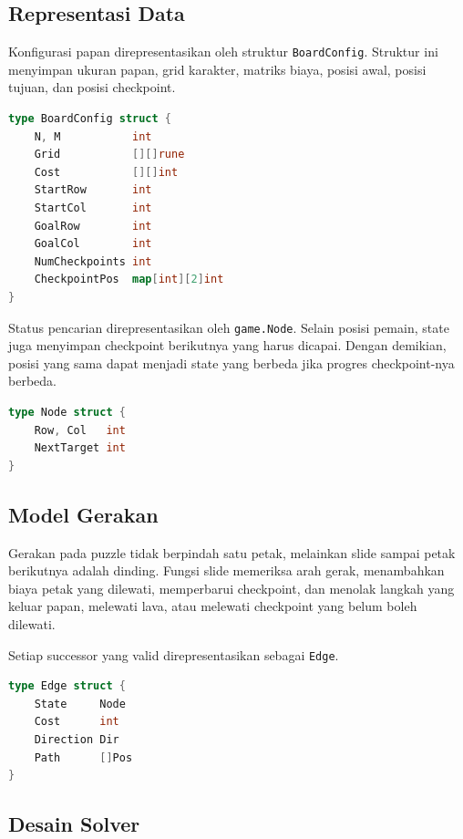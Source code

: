 \subsection{Representasi Data}\label{sub:Representasi Data}

Konfigurasi papan direpresentasikan oleh struktur \texttt{BoardConfig}.
Struktur ini menyimpan ukuran papan, grid karakter, matriks biaya,
posisi awal, posisi tujuan, dan posisi checkpoint.

\begin{lstlisting}[language=Go, basicstyle=\ttfamily\small, breaklines=true]
type BoardConfig struct {
    N, M           int
    Grid           [][]rune
    Cost           [][]int
    StartRow       int
    StartCol       int
    GoalRow        int
    GoalCol        int
    NumCheckpoints int
    CheckpointPos  map[int][2]int
}
\end{lstlisting}

Status pencarian direpresentasikan oleh \texttt{game.Node}. Selain
posisi pemain, state juga menyimpan checkpoint berikutnya yang harus
dicapai. Dengan demikian, posisi yang sama dapat menjadi state yang
berbeda jika progres checkpoint-nya berbeda.

\begin{lstlisting}[language=Go, basicstyle=\ttfamily\small, breaklines=true]
type Node struct {
    Row, Col   int
    NextTarget int
}
\end{lstlisting}

\subsection{Model Gerakan}\label{sub:Model Gerakan}

Gerakan pada puzzle tidak berpindah satu petak, melainkan slide
sampai petak berikutnya adalah dinding. Fungsi slide memeriksa arah
gerak, menambahkan biaya petak yang dilewati, memperbarui checkpoint,
dan menolak langkah yang keluar papan, melewati lava, atau melewati
checkpoint yang belum boleh dilewati.

Setiap successor yang valid direpresentasikan sebagai \texttt{Edge}.
\begin{lstlisting}[language=Go, basicstyle=\ttfamily\small, breaklines=true]
type Edge struct {
    State     Node
    Cost      int
    Direction Dir
    Path      []Pos
}
\end{lstlisting}

\subsection{Desain Solver}\label{sub:Desain Solver}


